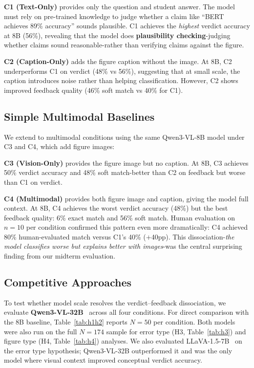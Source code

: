 \documentclass{article} %
\begin{document}
\textbf{C1 (Text-Only)} provides only the question and student answer. The model must rely on pre-trained knowledge to judge whether a claim like ``BERT achieves 89\% accuracy'' sounds plausible. C1 achieves the \textit{highest} verdict accuracy at 8B (56\%), revealing that the model does \textbf{plausibility checking}-judging whether claims sound reasonable-rather than verifying claims against the figure.

\textbf{C2 (Caption-Only)} adds the figure caption without the image. At 8B, C2 underperforms C1 on verdict (48\% vs 56\%), suggesting that at small scale, the caption introduces noise rather than helping classification. However, C2 shows improved feedback quality (46\% soft match vs 40\% for C1).

\subsection{Simple Multimodal Baselines}

We extend to multimodal conditions using the same Qwen3-VL-8B model under C3 and C4, which add figure images:

\textbf{C3 (Vision-Only)} provides the figure image but no caption. At 8B, C3 achieves 50\% verdict accuracy and 48\% soft match-better than C2 on feedback but worse than C1 on verdict.

\textbf{C4 (Multimodal)} provides both figure image and caption, giving the model full context. At 8B, C4 achieves the worst verdict accuracy (48\%) but the best feedback quality: 6\% exact match and 56\% soft match. Human evaluation on $n{=}10$ per condition confirmed this pattern even more dramatically: C4 achieved 80\% human-evaluated match versus C1's 40\% ($+$40pp). This dissociation-\textit{the model classifies worse but explains better with images}-was the central surprising finding from our midterm evaluation.

\subsection{Competitive Approaches}

To test whether model scale resolves the verdict--feedback dissociation, we evaluate \textbf{Qwen3-VL-32B}~\cite{bai2023qwenvl} across all four conditions. For direct comparison with the 8B baseline, Table~\ref{tab:h1h2} reports $N{=}50$ per condition. Both models were also run on the full $N{=}174$ sample for error type (H3, Table~\ref{tab:h3}) and figure type (H4, Table~\ref{tab:h4}) analyses. We also evaluated LLaVA-1.5-7B~\cite{liu2023llava15} on the error type hypothesis; Qwen3-VL-32B outperformed it and was the only model where visual context improved conceptual verdict accuracy.
\end{document}
